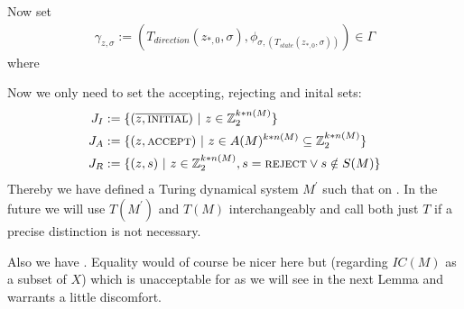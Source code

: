 Now set
\begin{align*}
	\gamma_{z,\sigma} := (T_{direction}(z_{*,0},\sigma) , \phi_{\sigma,(T_{state}(z_{*,0},\sigma))}) \in \Gamma
\end{align*}
where 

Now we only need to set the accepting, rejecting and inital sets:
\begin{align*}
	J_I & := \{(\overline{z,\text{\scshape{initial}}}) ~\vert~ z \in \mathbb{Z}_2^{k * n(M)} \} \\
	J_A & := \{(z,\text{\scshape{accept}}) ~\vert~ z \in A(M)^{k * n(M)} \subseteq \mathbb{Z}_2^{k * n(M)} \} \\
	J_R & := \{(z,s) ~\vert~ z \in \mathbb{Z}_2^{k * n(M)} , s = \text{\scshape{reject}} \vee s \notin S(M) \} \\
\end{align*}
Thereby we have defined a Turing dynamical system $M^\prime$ such that  on .
In the future we will use $T(M^\prime)$ and $T(M)$ interchangeably and call both just $T$ if a precise distinction is not necessary.

Also we have .
Equality would of course be nicer here but (regarding $IC(M)$ as a subset of $X$)  which is unacceptable for  as we will see in the next Lemma and warrants a little discomfort.
